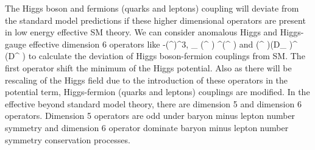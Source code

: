 \documentclass[final,3p]{CSP}
\begin{document}
The Higgs boson and fermions (quarks and leptons) coupling will deviate from the standard model predictions if these higher dimensional 
operators are present in low energy effective SM theory. We can consider anomalous Higgs and Higgs-gauge effective dimension 6 operators 
like -(\phi^{\dagger}\phi)^3,  \partial_{\mu} (\phi^{\dagger} \phi) \partial^{\mu}(\phi^{\dagger} \phi) and 
(\phi^{\dagger} \phi)(D_{\mu} \phi)^{\dagger} (D^{\mu} \phi) to calculate the deviation of Higgs boson-fermion couplings from SM. The 
first operator shift the minimum of the Higgs potential. Also as there will be rescaling of the Higgs field due to the introduction of 
these operators in the potential term, Higgs-fermion (quarks and leptons) couplings are modified. In the effective beyond standard model 
theory, there are dimension 5 and dimension 6 operators. Dimension 5 operators are odd under baryon minus lepton number symmetry and 
dimension 6 operator dominate baryon minus lepton number symmetry conservation processes. 
\end{document}
